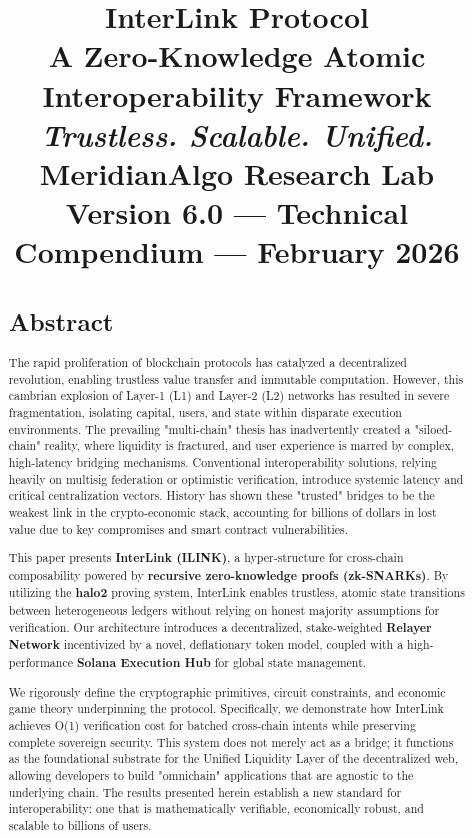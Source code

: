 \documentclass[11pt,a4paper]{article}
\title{
    \vspace{2in}
    \textbf{\Huge InterLink Protocol}\\
    \vspace{0.5in}
    \large A Zero-Knowledge Atomic Interoperability Framework\\
    \vspace{0.2in}
    \textit{Trustless. Scalable. Unified.}\\
    \vspace{1in}
    \textbf{MeridianAlgo Research Lab}\\
    \small Version 6.0 --- Technical Compendium --- February 2026
}
\author{}
\date{}
\begin{document}
\maketitle
\begin{titlepage}
\maketitle
\end{titlepage}
\newpage

\tableofcontents
\newpage

{}
\begin{abstract}
\section*{Abstract}
The rapid proliferation of blockchain protocols has catalyzed a decentralized revolution, enabling trustless value transfer and immutable computation. However, this cambrian explosion of Layer-1 (L1) and Layer-2 (L2) networks has resulted in severe fragmentation, isolating capital, users, and state within disparate execution environments. The prevailing "multi-chain" thesis has inadvertently created a "siloed-chain" reality, where liquidity is fractured, and user experience is marred by complex, high-latency bridging mechanisms. Conventional interoperability solutions, relying heavily on multisig federation or optimistic verification, introduce systemic latency and critical centralization vectors. History has shown these "trusted" bridges to be the weakest link in the crypto-economic stack, accounting for billions of dollars in lost value due to key compromises and smart contract vulnerabilities.

This paper presents \textbf{InterLink (ILINK)}, a hyper-structure for cross-chain composability powered by \textbf{recursive zero-knowledge proofs (zk-SNARKs)}. By utilizing the \textbf{halo2} proving system, InterLink enables trustless, atomic state transitions between heterogeneous ledgers without relying on honest majority assumptions for verification. Our architecture introduces a decentralized, stake-weighted \textbf{Relayer Network} incentivized by a novel, deflationary token model, coupled with a high-performance \textbf{Solana Execution Hub} for global state management. 

We rigorously define the cryptographic primitives, circuit constraints, and economic game theory underpinning the protocol. Specifically, we demonstrate how InterLink achieves O(1) verification cost for batched cross-chain intents while preserving complete sovereign security. This system does not merely act as a bridge; it functions as the foundational substrate for the Unified Liquidity Layer of the decentralized web, allowing developers to build "omnichain" applications that are agnostic to the underlying chain. The results presented herein establish a new standard for interoperability: one that is mathematically verifiable, economically robust, and scalable to billions of users.


\end{abstract}
\end{document}
